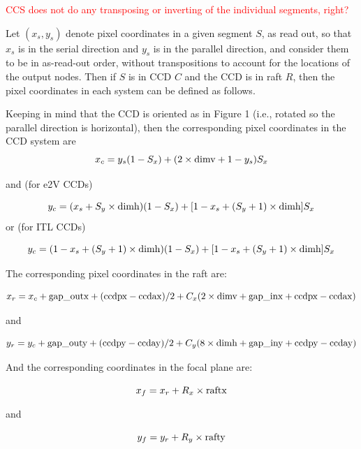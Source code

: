 \documentclass{article}[12pt]
\newcommand{\red}{\textcolor{red}}
\begin{document}
\red{CCS does not do any transposing or inverting of the individual segments, right?}

Let $(x_s, y_s)$ denote pixel coordinates in a given segment $S$, as read out, so that $x_s$ is in the serial direction and $y_s$ is in the parallel direction, and consider them to be in as-read-out order, without transpositions to account for the locations of the output nodes.  Then if $S$ is in CCD $C$ and the CCD is in raft $R$, then the pixel coordinates in each system can be defined as follows.

Keeping in mind that the CCD is oriented as in Figure 1 (i.e., rotated so the parallel direction is horizontal), then the corresponding pixel coordinates in the CCD system are 
\begin{equation}
x_c = y_s (1 - S_x) + (2 \times {\rm dimv} + 1 - y_s)  S_x
\end{equation}

and (for e2V CCDs)

\begin{equation}
y_c = (x_s + S_y \times {\rm dimh})  (1 - S_x) + [1 - x_s + (S_y + 1) \times {\rm dimh}] S_x
\end {equation}
or (for ITL CCDs)

\begin{equation}
y_c = (1 - x_s + (S_y  + 1) \times {\rm dimh} )  (1 - S_x) + [1 - x_s + (S_y + 1) \times {\rm dimh}] S_x
\end{equation}

The corresponding pixel coordinates in the raft are:

\begin{equation}
x_r = x_c + {\rm gap\_outx} + ({\rm ccdpx} - {\rm ccdax})/2 + C_x ( 2 \times {\rm dimv} + {\rm gap\_inx} + {\rm ccdpx} - {\rm ccdax})
\end{equation}

and

\begin{equation}
y_r = y_c + {\rm gap\_outy} + ({\rm ccdpy} - {\rm ccday})/2 + C_y ( 8 \times {\rm dimh} + {\rm gap\_iny} + {\rm ccdpy} - {\rm ccday})
\end{equation}

And the corresponding coordinates in the focal plane are:

\begin{equation}
x_f = x_r + R_x \times {\rm raftx}
\end{equation}

and

\begin{equation}
y_f = y_r + R_y \times {\rm rafty}
\end{equation}
\end{document}
